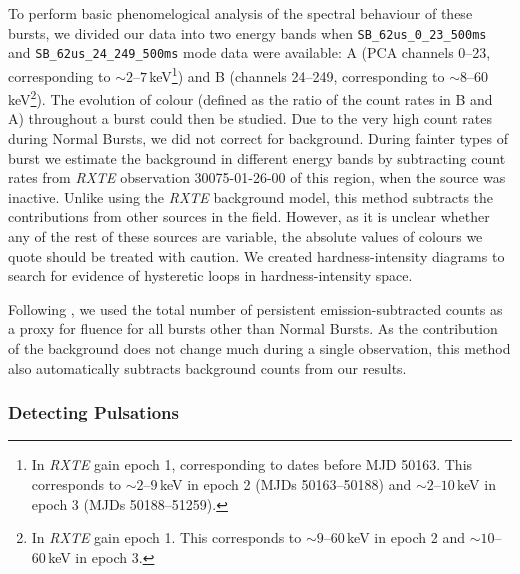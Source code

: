 \par To perform basic phenomelogical analysis of the spectral behaviour of these bursts, we divided our data into two energy bands when \texttt{SB\_62us\_0\_23\_500ms} and \texttt{SB\_62us\_24\_249\_500ms} mode data were available: A (PCA channels 0--23, corresponding to $\sim2$--$7$\,keV\footnote{In \textit{RXTE} gain epoch 1, corresponding to dates before MJD 50163.  This corresponds to $\sim2$--$9$\,keV in epoch 2 (MJDs 50163--50188) and $\sim2$--$10$\,keV in epoch 3 (MJDs 50188--51259).}) and B (channels 24--249, corresponding to $\sim8$--$60$\,keV\footnote{In \textit{RXTE} gain epoch 1.  This corresponds to $\sim9$--$60$\,keV in epoch 2 and $\sim10$--$60$\,keV in epoch 3.}).  The evolution of colour (defined as the ratio of the count rates in B and A) throughout a burst could then be studied.  Due to the very high count rates during Normal Bursts, we did not correct for background.  During fainter types of burst we estimate the background in different energy bands by subtracting count rates from \textit{RXTE} observation 30075-01-26-00 of this region, when the source was inactive.  Unlike using the \textit{RXTE} background model, this method subtracts the contributions from other sources in the field.  However, as it is unclear whether any of the rest of these sources are variable, the absolute values of colours we quote should be treated with caution.  We created hardness-intensity diagrams to search for evidence of hysteretic loops in hardness-intensity space.
\par Following \citet{Bagnoli_PopStudy}, we used the total number of persistent emission-subtracted counts as a proxy for fluence for all bursts other than Normal Bursts.  As the contribution of the background does not change much during a single observation, this method also automatically subtracts background counts from our results.

\subsubsection{Detecting Pulsations}

